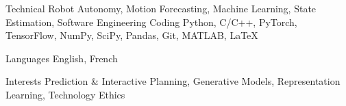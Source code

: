 

\begin{cvskills}

  \cvskill
    {Technical} %
    {Robot Autonomy, Motion Forecasting, Machine Learning, State Estimation, Software Engineering} %
  \cvskill
    {Coding} %
    {Python, C/C++, PyTorch, TensorFlow, NumPy, SciPy, Pandas, Git, MATLAB, LaTeX} %

  \cvskill
    {Languages} %
    {English, French} %
    
  \cvskill
    {Interests} %
    {Prediction \& Interactive Planning, Generative Models, Representation Learning, Technology Ethics} %

\end{cvskills}

